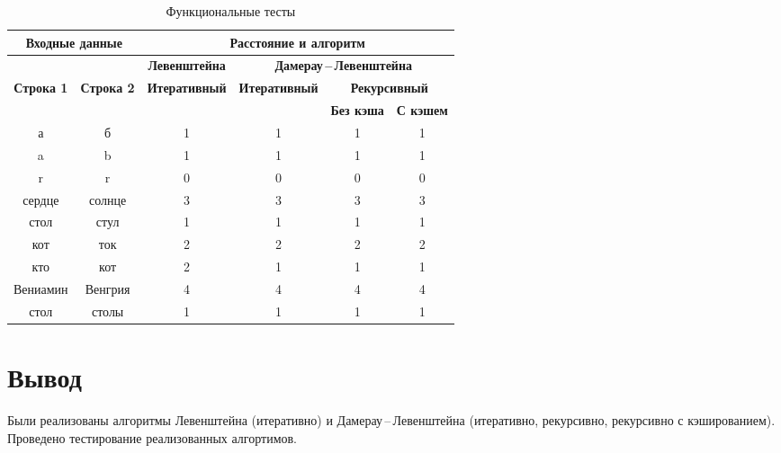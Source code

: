 \begin{table}[H]
	\small
	\begin{center}
		\begin{threeparttable}
		\caption{Функциональные тесты}
		\label{tbl:func_tests}
		\begin{tabular}{|c|c|c|c|c|c|}
			\hline
			\multicolumn{2}{|c|}{\bfseries Входные данные}
			& \multicolumn{4}{c|}{\bfseries Расстояние и алгоритм} \\ 
			\hline 
			&
			& \multicolumn{1}{c|}{\bfseries Левенштейна} 
			& \multicolumn{3}{c|}{\bfseries Дамерау\,--\,Левенштейна} \\ \cline{3-6}
			
			\bfseries Строка 1 & \bfseries Строка 2 & \bfseries Итеративный & \bfseries Итеративный
			
			& \multicolumn{2}{c|}{\bfseries Рекурсивный} \\ \cline{5-6}
			& & & & \bfseries Без кэша & \bfseries С кэшем \\
			\hline
			а & б & 1 & 1 & 1 & 1 \\
			\hline
			a & b & 1 & 1 & 1 & 1 \\
			\hline
			r & r & 0 & 0 & 0 & 0 \\
			\hline
			сердце & солнце & 3 & 3 & 3 & 3 \\
			\hline
			стол & стул & 1 & 1 & 1 & 1 \\
			\hline
			кот & ток & 2 & 2 & 2 & 2 \\
			\hline
			кто & кот & 2 & 1 & 1 & 1 \\
			\hline
			Вениамин & Венгрия & 4 & 4 & 4 & 4 \\
            \hline
			стол & столы & 1 & 1 & 1 & 1 \\
			\hline
		\end{tabular}	
		\end{threeparttable}
	\end{center}
\end{table}

\section*{Вывод}

Были реализованы алгоритмы Левенштейна (итеративно) и Дамерау\,--\,Левенштейна (итеративно, рекурсивно, рекурсивно с кэшированием). Проведено тестирование реализованных алгортимов.
